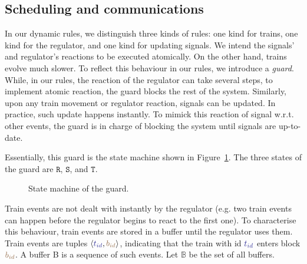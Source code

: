 \documentclass[runningheads]{llncs}
\newcommand{\tuple}[1]{\ensuremath{\langle #1\rangle}}
\newcommand{\posFmt}[1]{{\color{poscolor}{#1}}}
\newcommand{\bid}[1]{\ensuremath{\posFmt{b_{#1}}}}
\newcommand{\trainFmt}[1]{{\color{traincolor} #1}}
\newcommand{\tid}[1]{\ensuremath{\trainFmt{t_{#1}}}}
\newcommand{\guardFmt}[1]{{\color{guardcolor} \ensuremath{\mathtt{#1}}}}
\newcommand{\guardT}{\guardFmt{T}}
\newcommand{\guardS}{\guardFmt{S}}
\newcommand{\guardR}{\guardFmt{R}}
\newcommand{\bufferFmt}[1]{#1}
\newcommand{\bufferSet}{\ensuremath{\bufferFmt{\mathbb{B}}}\xspace}
\begin{document}

\subsection{Scheduling and communications}

In our dynamic rules, we distinguish three kinds of rules: one kind for trains, one kind for the regulator, and one kind for updating signals. We intend the signals' and regulator's reactions to be executed atomically. On the other hand, trains evolve much slower. To reflect this behaviour in our rules, we introduce a \emph{guard}. While, in our rules, the reaction of the regulator can take several steps, to implement atomic reaction, the guard blocks the rest of the system. Similarly, upon any train movement or regulator reaction, signals can be updated. In practice, such update happens instantly. To mimick this reaction of signal w.r.t. other events, the guard is in charge of blocking the system until signals are up-to-date.

Essentially, this guard is the state machine shown in Figure~\ref{fig:state_machine_guard}. The three states of the guard are \guardR, \guardS, and \guardT.

\begin{figure}
	\centering
	\caption{State machine of the guard.}
	\label{fig:state_machine_guard}
\end{figure}

Train events are not dealt with instantly by the regulator (e.g. two train events can happen before the regulator begins to react to the first one). To characterise this behaviour, train events are stored in a buffer until the regulator uses them. Train events are tuples \tuple{\tid{id}, \bid{id}}, indicating that the train with id $\tid{id}$ enters block \bid{id}. A buffer \bufferFmt{B} is a sequence of such events. Let \bufferSet{} be the set of all buffers.
\end{document}
